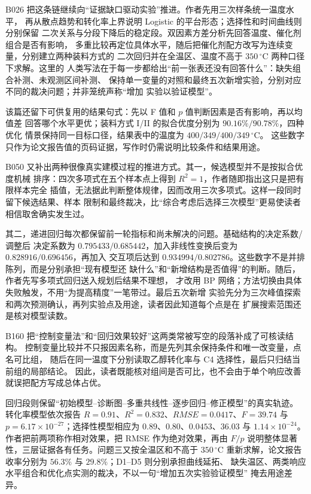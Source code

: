 B026 把这条链继续向“证据缺口驱动实验”推进。作者先用三次样条统一温度水平，
再从散点趋势和转化率上界说明 Logistic 的平台形态；选择性和时间曲线则分别保留
二次关系与分段下降后的稳定段。双因素方差分析先回答温度、催化剂组合是否有影响，
多重比较再定位具体水平，随后把催化剂配方改写为连续变量，分别建立两种装料方式的
二次回归并在全温区、温度不高于 $350\,^{\circ}\mathrm{C}$ 两种口径下求解。这里的
人类写法在于每一步都给出“前一张表还没有回答什么”：缺失组合补测、未观测区间补测、
保持单一变量的对照和最终五次新增实验，分别对应不同的裁决问题；并非笼统声称“增加
实验以验证模型”。

该篇还留下可供复用的结果句式：先以 F 值和 $p$ 值判断因素是否有影响，再以均值差
回答哪个水平更优；装料方式 I/II 的拟合优度分别为 $90.16\%/90.78\%$，四种优化
情景保持同一目标口径，结果表中的温度为 $400/349/400/349\,^{\circ}\mathrm{C}$。
这些数字只作为论文报告值的页码证据，写作时仍需说明比较条件和结果用途。

B050 又补出两种很像真实建模过程的推进方式。其一，候选模型并不是按拟合优度机械
排序：四次多项式在五个样本点上得到 $R^2=1$，作者随即指出这只是把有限样本完全
插值，无法据此判断整体规律，因而改用三次多项式。这样一段同时留下候选结果、样本
限制和最终裁决，比“综合考虑后选择三次模型”更易使读者相信取舍确实发生过。

其二，递进回归每次都保留前一轮指标和尚未解决的问题。基础结构的决定系数/调整后
决定系数为 $0.795433/0.685442$，加入非线性变换后变为 $0.828916/0.696456$，再加入
交互项后达到 $0.934994/0.802786$。这些数字不是并排陈列，而是分别承担“现有模型还
缺什么”和“新增结构是否值得”的判断。随后，作者先写多项式回归送入规划后结果不理想，
才改用 BP 网络；方法切换由具体失败触发，不用“为提高精度”一笔带过。最后五次新增
实验先分为三次峰值探索和两次预测确认，再列实验点及用途，读者因此知道每个点是在
扩展搜索范围还是核对模型读数。

B160 把“控制变量法”和“回归效果较好”这两类常被写空的段落补成了可核读结构。
控制变量比较并不只报因素名称，而是先列其余保持条件和唯一改变量，点名可比组，
随后在同一温度下分别读取乙醇转化率与 C4 选择性，最后只归结当前组的局部结论。
因此，读者既能核对组间是否可比，也不会由于单个响应改善就误把配方写成总体占优。

回归段则保留“初始模型--诊断图--多重共线性--逐步回归--修正模型”的真实轨迹。
转化率模型依次报告 $R=0.91$、$R^2=0.832$、$RMSE=0.0417$、$F=39.74$ 与
$p=6.17\times10^{-27}$；选择性模型相应为 $0.89$、$0.80$、$0.0453$、$36.03$ 与
$1.14\times10^{-24}$。作者把前两项称作相对效果，把 RMSE 作为绝对效果，再由 $F/p$
说明整体显著性，三层证据各有任务。问题三又按全温区和不高于 $350\,^{\circ}\mathrm{C}$
重新求解，论文报告收率分别为 $56.3\%$ 与 $29.8\%$；D1--D5 则分别承担曲线延拓、
缺失温区、两类响应水平组合和优化点实测的裁决，不以一句“增加五次实验验证模型”
掩去用途差异。

